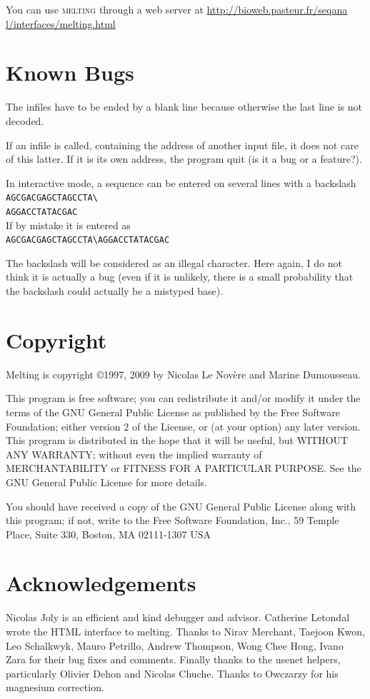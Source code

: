 \documentclass{article}
\begin{document}
You can use \textsc{melting} through a web server at \url{http://bioweb.pasteur.fr/seqana
l/interfaces/melting.html}
  
\section{Known Bugs }
The infiles have to be ended by a blank line because otherwise the last line is not decoded.

If an infile is called, containing the 
address of another input file, it does not care of this latter.  If it 
is its own address, the program quit (is it a bug or a feature?).   
 
In interactive mode, a sequence can be entered on several lines with a backslash\\
\texttt{AGCGACGAGCTAGCCTA{\textbackslash}\\
AGGACCTATACGAC}\\
If by mistake it is entered as  \\
\texttt{AGCGACGAGCTAGCCTA{\textbackslash}{}AGGACCTATACGAC}

The backslash will be considered 
 as an illegal character. Here again, I do not think it is actually a bug 
(even if it is unlikely, there is a small probability that the  backslash 
could actually be a mistyped base).   
   
\section{Copyright }
Melting is copyright 
\copyright 1997, 2009 by Nicolas Le Nov\`ere and Marine Dumousseau.  

This program is free software; 
you can redistribute it and/or modify it under the terms of the GNU General 
Public License as published by the Free Software Foundation; either version 
2 of the License, or (at your option) any later version.   
  This program 
is distributed in the hope that it will be useful, but WITHOUT ANY WARRANTY; 
without even the implied warranty of MERCHANTABILITY or FITNESS FOR A 
PARTICULAR PURPOSE.  See the GNU General Public License for more details. 
  
  You should have received a copy of the GNU General Public License 
along with this program; if not, write to the Free Software Foundation, 
Inc., 59 Temple Place, Suite 330, Boston, MA  02111-1307 USA   
   
\section{Acknowledgements}
Nicolas Joly is an efficient and kind debugger and advisor.  Catherine
Letondal wrote the HTML interface to melting. Thanks to Nirav Merchant,
Taejoon Kwon, Leo Schalkwyk, Mauro Petrillo, Andrew Thompson, Wong Chee Hong, Ivano
Zara for their bug fixes and comments.  Finally thanks to the usenet
helpers, particularly Olivier Dehon and Nicolas Chuche.
Thanks to Owczarzy for his magnesium correction.
   
\end{document}
